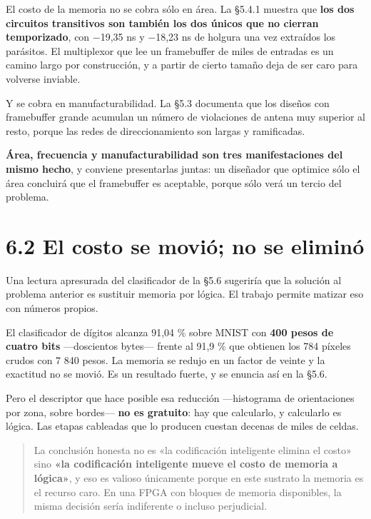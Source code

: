 El costo de la memoria no se cobra sólo en área. La §5.4.1 muestra que
\textbf{los dos circuitos transitivos son también los dos únicos que no
cierran temporizado}, con −19,35 ns y −18,23 ns de holgura una vez
extraídos los parásitos. El multiplexor que lee un framebuffer de miles
de entradas es un camino largo por construcción, y a partir de cierto
tamaño deja de ser caro para volverse inviable.

Y se cobra en manufacturabilidad. La §5.3 documenta que los diseños con
framebuffer grande acumulan un número de violaciones de antena muy
superior al resto, porque las redes de direccionamiento son largas y
ramificadas.

\textbf{Área, frecuencia y manufacturabilidad son tres manifestaciones
del mismo hecho}, y conviene presentarlas juntas: un diseñador que
optimice sólo el área concluirá que el framebuffer es aceptable, porque
sólo verá un tercio del problema.

\section{6.2 El costo se movió; no se
eliminó}\label{el-costo-se-moviuxf3-no-se-eliminuxf3}

Una lectura apresurada del clasificador de la §5.6 sugeriría que la
solución al problema anterior es sustituir memoria por lógica. El
trabajo permite matizar eso con números propios.

El clasificador de dígitos alcanza 91,04 \% sobre MNIST con \textbf{400
pesos de cuatro bits} ---doscientos bytes--- frente al 91,9 \% que
obtienen los 784 píxeles crudos con 7 840 pesos. La memoria se redujo en
un factor de veinte y la exactitud no se movió. Es un resultado fuerte,
y se enuncia así en la §5.6.

Pero el descriptor que hace posible esa reducción ---histograma de
orientaciones por zona, sobre bordes--- \textbf{no es gratuito}: hay que
calcularlo, y calcularlo es lógica. Las etapas cableadas que lo producen
cuestan decenas de miles de celdas.

\begin{quote}
La conclusión honesta no es «la codificación inteligente elimina el
costo» sino \textbf{«la codificación inteligente mueve el costo de
memoria a lógica»}, y eso es valioso únicamente porque en este sustrato
la memoria es el recurso caro. En una FPGA con bloques de memoria
disponibles, la misma decisión sería indiferente o incluso perjudicial.
\end{quote}

